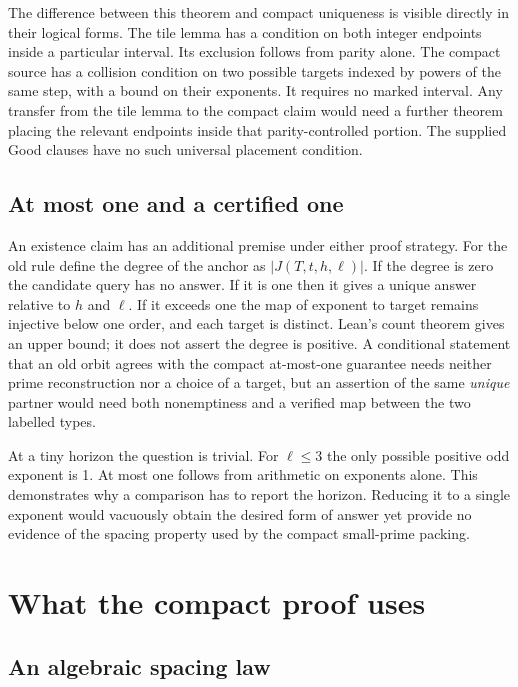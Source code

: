 \documentclass[12pt,letterpaper]{article}
\begin{document}
The difference between this theorem and compact uniqueness is visible directly in their logical forms. The tile lemma has a condition on both integer endpoints inside a particular interval. Its exclusion follows from parity alone. The compact source has a collision condition on two possible targets indexed by powers of the same step, with a bound on their exponents. It requires no marked interval. Any transfer from the tile lemma to the compact claim would need a further theorem placing the relevant endpoints inside that parity-controlled portion. The supplied Good clauses have no such universal placement condition.

\subsection{At most one and a certified one}

An existence claim has an additional premise under either proof strategy. For the old rule define the degree of the anchor as $|J(T,t,h,\ell)|$. If the degree is zero the candidate query has no answer. If it is one then it gives a unique answer relative to $h$ and $\ell$. If it exceeds one the map of exponent to target remains injective below one order, and each target is distinct. Lean's count theorem gives an upper bound; it does not assert the degree is positive. A conditional statement that an old orbit agrees with the compact at-most-one guarantee needs neither prime reconstruction nor a choice of a target, but an assertion of the same \emph{unique} partner would need both nonemptiness and a verified map between the two labelled types.

At a tiny horizon the question is trivial. For $\ell\le3$ the only possible positive odd exponent is 1. At most one follows from arithmetic on exponents alone. This demonstrates why a comparison has to report the horizon. Reducing it to a single exponent would vacuously obtain the desired form of answer yet provide no evidence of the spacing property used by the compact small-prime packing.

\section{What the compact proof uses}
\label{sec:new}

\subsection{An algebraic spacing law}
\end{document}
